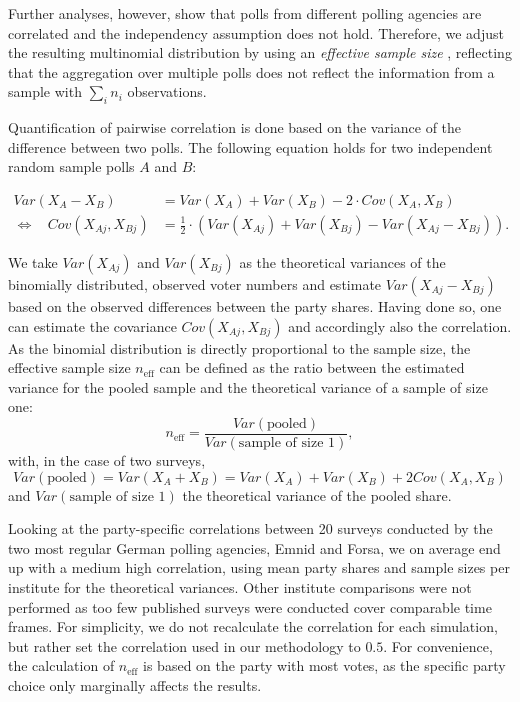 \documentclass[smallcondensed]{svjour3}     %
\begin{document}
Further analyses, however, show that polls from different
polling agencies are correlated
and the independency assumption does not hold.
Therefore, we adjust the resulting multinomial
distribution by using an \textit{effective sample size} \citep{hanley_2003},
reflecting that the aggregation over multiple polls does not reflect the 
information from a sample with $\sum_i n_i$ observations.

Quantification of pairwise correlation is done based on the variance of the
difference between two polls. The following equation holds for two independent
random sample polls $A$ and $B$:

\begin{equation}
\begin{aligned}
Var(X_A - X_B) &= Var(X_A) + Var(X_B) - 2 \cdot Cov(X_A, X_B) \\
\Leftrightarrow \ \ \ \ Cov(X_{Aj}, X_{Bj}) &= \frac{1}{2} \cdot \left(Var(X_{Aj}) + Var(X_{Bj}) - Var(X_{Aj} - X_{Bj}) \right).
\end{aligned}
\end{equation}

We take $Var(X_{Aj})$ and $Var(X_{Bj})$ as the theoretical variances of the binomially distributed, observed voter numbers and estimate $Var(X_{Aj} - X_{Bj})$ based on the observed differences between the party shares. Having done so, one can estimate the covariance $Cov(X_{Aj}, X_{Bj})$ and accordingly also the correlation. As the binomial distribution is directly proportional to the sample size, the effective sample size $n_{\text{eff}}$ can be defined as the ratio between the estimated variance for the pooled sample and the theoretical variance of a sample of size one:
$$
n_{\text{eff}} = \frac{Var(\text{pooled})}{Var(\text{sample of size 1})},
$$
with, in the case of two surveys,
$$
Var(\text{pooled}) = Var(X_A + X_B) = Var(X_A) + Var(X_B) + 2 Cov(X_A,X_B)
$$
and $Var(\text{sample of size 1})$ the theoretical variance of the pooled share.

Looking at the party-specific correlations between 20 surveys conducted by the two most regular German polling agencies, Emnid and Forsa, we on average end up with a medium high correlation, using mean party shares and sample sizes per institute for the theoretical variances. Other institute comparisons were not performed as too few published surveys were conducted cover comparable time frames. For simplicity, we do not recalculate the correlation for each simulation, but rather set the correlation used in our methodology to $0.5$.
For convenience, the calculation of $n_{\text{eff}}$ is based on the party with most votes, as the specific party choice only marginally affects the results.
\end{document}
